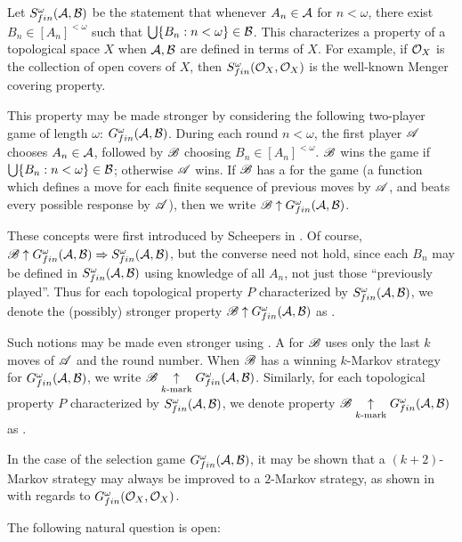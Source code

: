 \documentclass{amsart}
\begin{document}
Let \(S^\omega_{fin}(\mathcal{A},\mathcal{B})\) be the statement that whenever
\(A_n\in\mathcal{A}\) for \(n<\omega\), there exist \(B_n\in[A_n]^{<\omega}\)
such that \(\bigcup\{B_n:n<\omega\}\in\mathcal{B}\). This
 characterizes a property of a topological space
\(X\) when \(\mathcal{A},\mathcal{B}\) are defined in terms of \(X\). For example,
if \(\mathcal{O}_X\) is the collection of open covers of \(X\), then
\(S^\omega_{fin}(\mathcal{O}_X,\mathcal{O}_X)\) is the well-known Menger covering property.

This property may be made stronger by considering the following two-player
game of length \(\omega\): \(G^\omega_{fin}(\mathcal{A},\mathcal{B})\). During each round
\(n<\omega\), the first player \(\mathscr{A}\) chooses \(A_n\in\mathcal{A}\), followed
by \(\mathscr{B}\) choosing \(B_n\in[A_n]^{<\omega}\). \(\mathscr{B}\) wins the game
if \(\bigcup\{B_n:n<\omega\}\in\mathcal{B}\); otherwise \(\mathscr{A}\) wins.
If \(\mathscr{B}\) has a  for the game (a function
which defines a move for each finite sequence of previous moves by
\(\mathscr{A}\), and beats every possible response by \(\mathscr{A}\)), then we write
\(\mathscr{B}\uparrow G^\omega_{fin}(\mathcal{A},\mathcal{B})\).

These concepts were first introduced by Scheepers in \cite{SchOpen}.
Of course,
\(\mathscr{B}\uparrow G^\omega_{fin}(\mathcal{A},\mathcal{B})\Rightarrow S^\omega_{fin}(\mathcal{A},\mathcal{B})\),
but the converse need not hold, since each \(B_n\) may be defined in
\(S^\omega_{fin}(\mathcal{A},\mathcal{B})\) using knowledge of all \(A_n\), not just
those ``previously played''. Thus for each topological property \(P\)
characterized by \(S^\omega_{fin}(\mathcal{A},\mathcal{B})\), we denote the (possibly)
stronger property \(\mathscr{B}\uparrow G^\omega_{fin}(\mathcal{A},\mathcal{B})\) as .

Such notions may be made even stronger using
. A  for
\(\mathscr{B}\) uses only the last \(k\) moves of \(\mathscr{A}\) and the round number.
When \(\mathscr{B}\) has a winning \(k\)-Markov strategy for \(G^\omega_{fin}(\mathcal{A},\mathcal{B})\),
we write \(\mathscr{B}\underset{k\text{-mark}}{\uparrow}G^\omega_{fin}(\mathcal{A},\mathcal{B})\).
Similarly, for each topological property \(P\)
characterized by \(S^\omega_{fin}(\mathcal{A},\mathcal{B})\), we denote
property \(\mathscr{B}\underset{k\text{-mark}}{\uparrow}G^\omega_{fin}(\mathcal{A},\mathcal{B})\) as .

In the case of the selection game \(G^\omega_{fin}(\mathcal{A},\mathcal{B})\),
it may be shown that
a \((k+2)\)-Markov strategy may always be improved to a \(2\)-Markov strategy,
as shown in \cite{ClontzMenger} with regards to
\(G^\omega_{fin}(\mathcal{O}_X,\mathcal{O}_X)\).

The following natural question is open:
\end{document}
